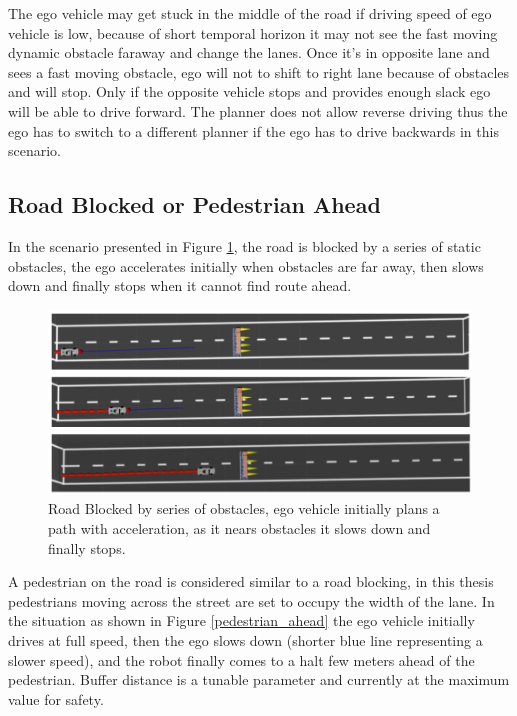 The ego vehicle may get stuck in the middle of the road if driving speed of ego vehicle is low, because of short temporal horizon it may not see the fast moving dynamic obstacle faraway and change the lanes. Once it's in opposite lane and sees a fast moving obstacle, ego will not to shift to right lane because of obstacles and will stop. Only if the opposite vehicle stops and provides enough slack ego will be able to drive forward. The planner does not allow reverse driving thus the ego has to switch to a different planner if the ego has to drive backwards in this scenario. 


\subsection{Road Blocked or Pedestrian Ahead}

In the scenario presented in Figure \ref{road_blocked}, the road is blocked by a series of static obstacles, the ego accelerates initially when obstacles are far away, then slows down and finally stops when it cannot find route ahead. 

\begin{figure}
    \centering
    \includegraphics[width=1.0\textwidth]{Images/evaluation/stopping_lane_blocked.jpg}
    \caption{Road Blocked by series of obstacles, ego vehicle initially plans a path with acceleration, as it nears obstacles it slows down and finally stops.}
    \label{road_blocked}
\end{figure}

A pedestrian on the road is considered similar to a road blocking, in this thesis pedestrians moving across the street are set to occupy the width of the lane. In the situation as shown in Figure \ref{pedestrian_ahead} the ego vehicle initially drives at full speed, then the ego slows down (shorter blue line representing a slower speed), and the robot finally comes to a halt few meters ahead of the pedestrian. Buffer distance is a tunable parameter and currently at the maximum value for safety. 

